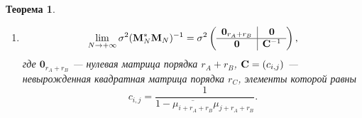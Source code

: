 \documentclass[12pt,a4paper]{article}
\newtheorem{theorem}{Теорема}
\begin{document}
\begin{theorem}
\begin{enumerate}
	    \item 
	    \begin{equation*}
	    \lim_{N \to + \infty} \sigma^2 (\mathbf{M}_N^* \mathbf{M}_N)^{-1} = \sigma^2 \left( \begin{array}{c|c}
	    \mathbf{0}_{r_A + r_B} & \mathbf{0} \\ \hline
	    \mathbf{0} & \mathbf{C}^{-1}
	    \end{array}  \right),
	    \end{equation*}
	    где $\mathbf{0}_{r_A + r_B}$ --- нулевая матрица порядка $r_A + r_B$, $\mathbf{C} = (c_{i,j})$ --- невырожденная квадратная матрица порядка $r_C$, элементы которой равны
	    \begin{equation*}
	    c_{i, j} = \frac{1}{1 - \overline{\mu_{i+r_A+r_B}} \mu_{j+r_A+r_B}}.
	    \end{equation*}
	\end{enumerate}
\end{theorem}
	
\end{document}
